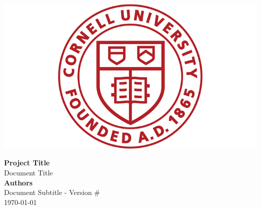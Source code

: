 \documentclass[letterpaper, 10 pt, journal, twoside]{article}
\begin{document}
	

	\begin{vwcol}[widths={0.3,0.7},sep=0.5cm, justify=flush,rule=0.2pt,indent=0em] 
		\vspace{1cm}
		\includegraphics[width=0.3\linewidth]{figures/logo.png} 
		
		\large{\textbf{Project Title}}\\
		Document Title\\
		\large{\textbf{Authors}}\\
		Document Subtitle - Version \#\\
		\today 
	\end{vwcol} 

\vspace{5mm}




\small


\end{document}
